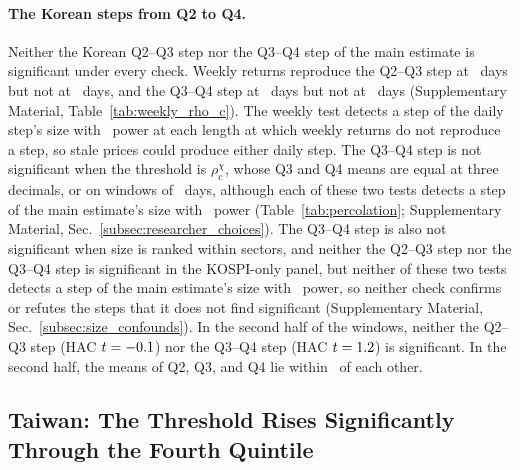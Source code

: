 \documentclass[a4paper,fleqn]{cas-sc}
\begin{document}
\paragraph{The Korean steps from Q2 to Q4.}\label{subsec:korean_middle_steps} Neither the Korean Q2--Q3 step nor the Q3--Q4 step of the main estimate is significant under every check. Weekly returns reproduce the Q2--Q3 step at \wkWindowLong\ days but not at \wkWindowShort\ days, and the Q3--Q4 step at \wkWindowShort\ days but not at \wkWindowLong\ days (Supplementary Material, Table~\ref{tab:weekly_rho_c}). The weekly test detects a step of the daily step's size with \detectPowerPct\ power at each length at which weekly returns do not reproduce a step, so stale prices could produce either daily step. The Q3--Q4 step is not significant when the threshold is $\rho_c^{\chi}$, whose Q3 and Q4 means are equal at three decimals, or on windows of \windowDaysWthirty\ days, although each of these two tests detects a step of the main estimate's size with \detectPowerPct\ power (Table~\ref{tab:percolation}; Supplementary Material, Sec.~\ref{subsec:researcher_choices}). The Q3--Q4 step is also not significant when size is ranked within sectors, and neither the Q2--Q3 step nor the Q3--Q4 step is significant in the KOSPI-only panel, but neither of these two tests detects a step of the main estimate's size with \detectPowerPct\ power, so neither check confirms or refutes the steps that it does not find significant (Supplementary Material, Sec.~\ref{subsec:size_confounds}). In the second half of the windows, neither the Q2--Q3 step (HAC $t = -0.1$) nor the Q3--Q4 step (HAC $t = 1.2$) is significant. In the second half, the means of Q2, Q3, and Q4 lie within \rhoCSecondHalfInteriorSpan\ of each other.

\subsection{Taiwan: The Threshold Rises Significantly Through the Fourth Quintile}\label{subsec:taiwan}
\end{document}
